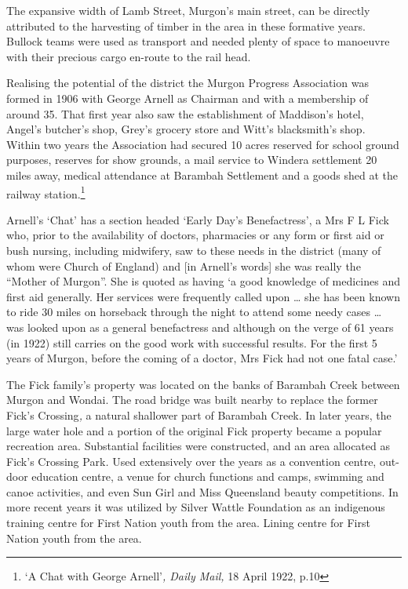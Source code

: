 The expansive width of Lamb Street, Murgon's main street, can be directly attributed to the harvesting of timber in the area in these formative years. Bullock teams were used as transport and needed plenty of space to manoeuvre with their precious cargo en-route to the rail head.

Realising the potential of the district the Murgon Progress Association was formed in 1906 with George Arnell as Chairman and with a membership of around 35. That first year also saw the establishment of Maddison's hotel, Angel's butcher's shop, Grey's grocery store and Witt's blacksmith's shop. Within two years the Association had secured 10 acres reserved for school ground purposes, reserves for show grounds, a mail service to Windera settlement 20 miles away, medical attendance at Barambah Settlement and a goods shed at the railway station.\footnote{`A Chat with George Arnell'\emph{, Daily Mail,} 18 April 1922, p.10}

Arnell's `Chat' has a section headed `Early Day's Benefactress', a Mrs F L Fick who, prior to the availability of doctors, pharmacies or any form or first aid or bush nursing, including midwifery, saw to these needs in the district (many of whom were Church of England) and {[}in Arnell's words{]} she was really the ``Mother of Murgon''. She is quoted as having `a good knowledge of medicines and first aid generally. Her services were frequently called upon \ldots{} she has been known to ride 30 miles on horseback through the night to attend some needy cases \ldots{} was looked upon as a general benefactress and although on the verge of 61 years (in 1922) still carries on the good work with successful results. For the first 5 years of Murgon, before the coming of a doctor, Mrs Fick had not one fatal case.'

The Fick family's property was located on the banks of Barambah Creek between Murgon and Wondai. The road bridge was built nearby to replace the former Fick's Crossing\emph{,} a natural shallower part of Barambah Creek. In later years, the large water hole and a portion of the original Fick property became a popular recreation area. Substantial facilities were constructed, and an area allocated as Fick's Crossing Park\emph{.} Used extensively over the years as a convention centre, out-door education centre, a venue for church functions and camps, swimming and canoe activities, and even Sun Girl and Miss Queensland beauty competitions. In more recent years it was utilized by Silver Wattle Foundation as an indigenous training centre for First Nation youth from the area. Lining centre for First Nation youth from the area.

